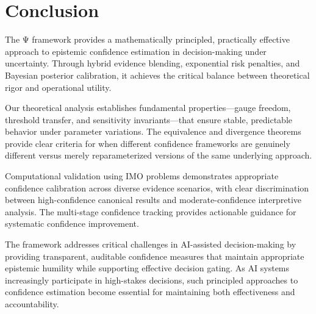 \documentclass[12pt,a4paper]{article}
\begin{document}
\section{Conclusion}

The Ψ framework provides a mathematically principled, practically effective approach to epistemic confidence estimation in decision-making under uncertainty. Through hybrid evidence blending, exponential risk penalties, and Bayesian posterior calibration, it achieves the critical balance between theoretical rigor and operational utility.

Our theoretical analysis establishes fundamental properties—gauge freedom, threshold transfer, and sensitivity invariants—that ensure stable, predictable behavior under parameter variations. The equivalence and divergence theorems provide clear criteria for when different confidence frameworks are genuinely different versus merely reparameterized versions of the same underlying approach.

Computational validation using IMO problems demonstrates appropriate confidence calibration across diverse evidence scenarios, with clear discrimination between high-confidence canonical results and moderate-confidence interpretive analysis. The multi-stage confidence tracking provides actionable guidance for systematic confidence improvement.

The framework addresses critical challenges in AI-assisted decision-making by providing transparent, auditable confidence measures that maintain appropriate epistemic humility while supporting effective decision gating. As AI systems increasingly participate in high-stakes decisions, such principled approaches to confidence estimation become essential for maintaining both effectiveness and accountability.


\end{document}
